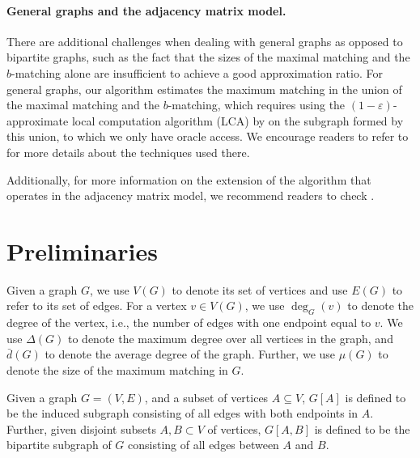 \documentclass[letterpaper,11pt]{article}
\renewcommand{\epsilon}{\varepsilon}
\begin{document}
\paragraph{General graphs and the adjacency matrix model.} There are additional challenges when dealing with general graphs as opposed to bipartite graphs, such as the fact that the sizes of the maximal matching and the $b$-matching alone are insufficient to achieve a good approximation ratio. For general graphs, our algorithm estimates the maximum matching in the union of the maximal matching and the $b$-matching, which requires using the $(1-\epsilon)$-approximate local computation algorithm (LCA) by \cite{LeviRY17} on the subgraph formed by this union, to which we only have oracle access. We encourage readers to refer to  for more details about the techniques used there.

Additionally, for more information on the extension of the algorithm that operates in the adjacency matrix model, we recommend readers to check .



























\section{Preliminaries}\label{sec:preliminaries}
Given a graph $G$, we use $V(G)$ to denote its set of vertices and use $E(G)$ to refer to its set of edges.
For a vertex $v\in V(G)$, we use $\deg_G(v)$ to denote the degree of the vertex, i.e., the number of edges with one endpoint equal to $v$. We use $\Delta(G)$ to denote the maximum degree over all vertices in the graph, and $\bar{d}(G)$ to denote the average degree of the graph. Further, we use $\mu(G)$ to denote the size of the maximum matching in $G$.

Given a graph $G=(V,E)$, and a subset of vertices $A\subseteq V$, $G[A]$ is defined to be the induced subgraph consisting of all edges with both endpoints in $A$.
Further, given disjoint subsets $A,B\subset V$ of vertices, $G[A,B]$ is defined to be the bipartite subgraph of $G$ consisting of all edges between $A$ and $B$.
\end{document}
